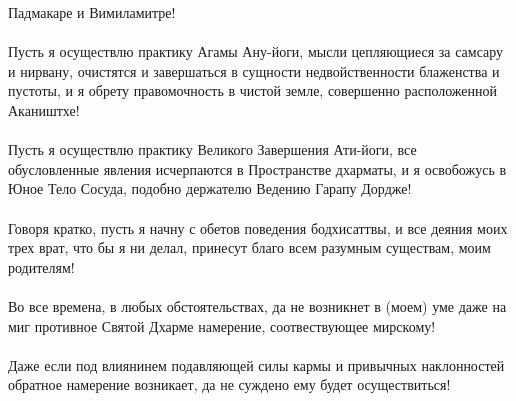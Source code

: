 Падмакаре и Вимиламитре!\\
\\
Пусть я осуществлю практику Агамы Ану-йоги, мысли
цепляю\-щиеся за самсару и нирвану, очистятся и завершаться
в сущности недвойственности блаженства и пустоты,
и я обрету правомочность в чистой земле, совершенно расположенной Акаништхе!\\
\\
Пусть я осуществлю практику Великого Завершения Ати-йоги,
все обусловленные явления исчерпаются в Пространстве дхарматы,
и я освобожусь в Юное Тело Сосуда, подобно держателю Ведению Гарапу Дордже!\\
\\
Говоря кратко, пусть я начну с обетов поведения бодхисаттвы,
и все деяния моих трех врат, что бы я ни делал,
принесут благо всем разумным существам, моим родителям!\\
\\
Во все времена, в любых обстоятельствах, да не возникнет
в (моем) уме даже на миг противное Святой Дхарме намерение, соотвествующее мирскому!\\
\\
Даже если под влиянинем подавляющей силы кармы и привыч\-ных наклонностей 
обратное намерение возникает, да не сужде\-но ему будет осуществиться!\\

